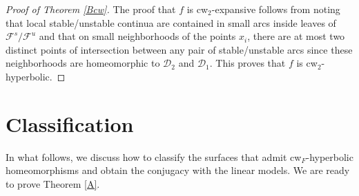 \documentclass{amsart}
\theoremstyle{plain}
\theoremstyle{definition}
\newcommand{\mc}{\mathcal}
\begin{document}
\begin{proof}[Proof of Theorem \ref{Bcw}]
The proof that $f$ is cw$_2$-expansive follows from noting that local stable/unstable continua are contained in small arcs inside leaves of $\mc{F}^s/\mc{F}^u$ and that on small neighborhoods of the points $x_i$, there are at most two distinct points of intersection between any pair of stable/unstable arcs since these neighborhoods are homeomorphic to $\mc{D}_2$ and $\mc{D}_1$. This proves that $f$ is cw$_2$-hyperbolic.
\end{proof}


\section{Classification}


In what follows, we discuss how to classify the surfaces that admit cw$_F$-hyperbolic homeomorphisms and obtain the conjugacy with the linear models. We are ready to prove Theorem \ref{A}.
\end{document}
